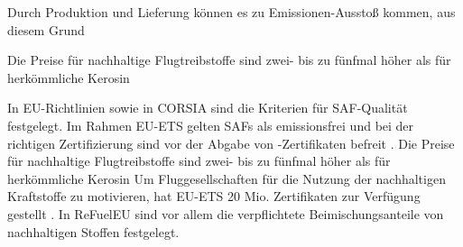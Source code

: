 


Durch Produktion und Lieferung können es zu Emissionen-Ausstoß kommen, aus diesem Grund 


Die Preise für nachhaltige Flugtreibstoffe sind zwei- bis zu fünfmal höher als für herkömmliche Kerosin \cite{iata_saf_2024} %

In EU-Richtlinien sowie in CORSIA sind die Kriterien für SAF-Qualität festgelegt.
Im Rahmen EU-ETS gelten SAFs als emissionsfrei und bei der richtigen Zertifizierung sind vor der Abgabe von -Zertifikaten 
befreit \cite{icao_saf_conversion_2024}. Die Preise für nachhaltige Flugtreibstoffe sind zwei- bis zu fünfmal höher als für herkömmliche Kerosin \cite{iata_saf_2024} %
Um Fluggesellschaften für die Nutzung der nachhaltigen Kraftstoffe zu motivieren, hat EU-ETS
20 Mio. Zertifikaten zur Verfügung gestellt \cite{icao_saf_conversion_2024}. 
In ReFuelEU sind vor allem die verpflichtete Beimischungsanteile von nachhaltigen Stoffen festgelegt.

